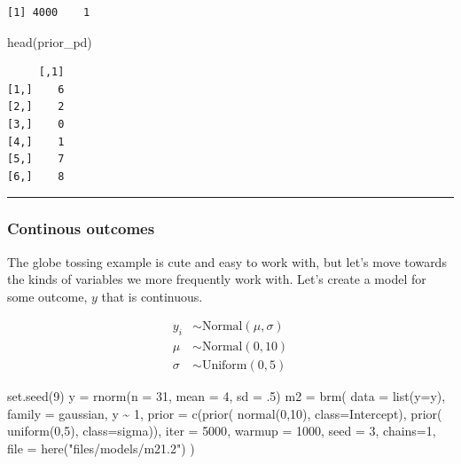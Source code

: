\documentclass[
  letterpaper,
  DIV=11,
  numbers=noendperiod]{scrartcl}
\newenvironment{Shaded}{\begin{snugshade}}{\end{snugshade}}
\newcommand{\AttributeTok}[1]{\textcolor[rgb]{0.40,0.45,0.13}{#1}}
\newcommand{\DecValTok}[1]{\textcolor[rgb]{0.68,0.00,0.00}{#1}}
\newcommand{\FunctionTok}[1]{\textcolor[rgb]{0.28,0.35,0.67}{#1}}
\newcommand{\NormalTok}[1]{\textcolor[rgb]{0.00,0.23,0.31}{#1}}
\newcommand{\OtherTok}[1]{\textcolor[rgb]{0.00,0.23,0.31}{#1}}
\newcommand{\SpecialCharTok}[1]{\textcolor[rgb]{0.37,0.37,0.37}{#1}}
\newcommand{\StringTok}[1]{\textcolor[rgb]{0.13,0.47,0.30}{#1}}
\begin{document}
\begin{verbatim}
[1] 4000    1
\end{verbatim}

\begin{Shaded}
\begin{Highlighting}[]
\FunctionTok{head}\NormalTok{(prior\_pd)}
\end{Highlighting}
\end{Shaded}

\begin{verbatim}
     [,1]
[1,]    6
[2,]    2
[3,]    0
[4,]    1
[5,]    7
[6,]    8
\end{verbatim}

\begin{center}\rule{0.5\linewidth}{0.5pt}\end{center}

\subsubsection{Continous outcomes}\label{continous-outcomes}

The globe tossing example is cute and easy to work with, but let's move
towards the kinds of variables we more frequently work with. Let's
create a model for some outcome, \(y\) that is continuous.

\begin{align*}
y_i &\sim \text{Normal}(\mu, \sigma) \\
\mu &\sim \text{Normal}(0, 10) \\
\sigma &\sim \text{Uniform}(0, 5)
\end{align*}

\begin{Shaded}
\begin{Highlighting}[]
\FunctionTok{set.seed}\NormalTok{(}\DecValTok{9}\NormalTok{)}
\NormalTok{y }\OtherTok{=} \FunctionTok{rnorm}\NormalTok{(}\AttributeTok{n =} \DecValTok{31}\NormalTok{, }\AttributeTok{mean =} \DecValTok{4}\NormalTok{, }\AttributeTok{sd =}\NormalTok{ .}\DecValTok{5}\NormalTok{)}
\NormalTok{m2 }\OtherTok{=} \FunctionTok{brm}\NormalTok{(}
  \AttributeTok{data =} \FunctionTok{list}\NormalTok{(}\AttributeTok{y=}\NormalTok{y),}
  \AttributeTok{family =}\NormalTok{ gaussian,}
\NormalTok{  y }\SpecialCharTok{\textasciitilde{}} \DecValTok{1}\NormalTok{,}
  \AttributeTok{prior =} \FunctionTok{c}\NormalTok{(}\FunctionTok{prior}\NormalTok{( }\FunctionTok{normal}\NormalTok{(}\DecValTok{0}\NormalTok{,}\DecValTok{10}\NormalTok{), }\AttributeTok{class=}\NormalTok{Intercept),}
            \FunctionTok{prior}\NormalTok{( }\FunctionTok{uniform}\NormalTok{(}\DecValTok{0}\NormalTok{,}\DecValTok{5}\NormalTok{), }\AttributeTok{class=}\NormalTok{sigma)),  }
      \AttributeTok{iter =} \DecValTok{5000}\NormalTok{, }\AttributeTok{warmup =} \DecValTok{1000}\NormalTok{, }\AttributeTok{seed =} \DecValTok{3}\NormalTok{, }\AttributeTok{chains=}\DecValTok{1}\NormalTok{,}
  \AttributeTok{file =} \FunctionTok{here}\NormalTok{(}\StringTok{"files/models/m21.2"}\NormalTok{)}
\NormalTok{)}
\end{Highlighting}
\end{Shaded}
\end{document}
